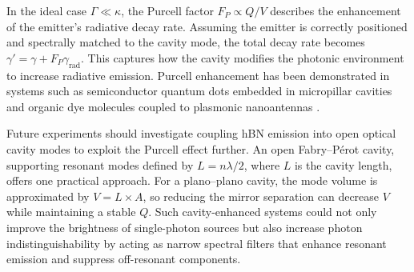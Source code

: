 In the ideal case $\Gamma \ll \kappa$, the Purcell factor $F_P \propto Q/V$ describes the enhancement of the emitter’s radiative decay rate. Assuming the emitter is correctly positioned and spectrally matched to the cavity mode, the total decay rate becomes $\gamma' = \gamma + F_P \gamma_{\text{rad}}$. This captures how the cavity modifies the photonic environment to increase radiative emission. Purcell enhancement has been demonstrated in systems such as semiconductor quantum dots embedded in micropillar cavities \cite{Engel2023} and organic dye molecules coupled to plasmonic nanoantennas \cite{Zhao2020}.

Future experiments should investigate coupling hBN emission into open optical cavity modes to exploit the Purcell effect further. An open Fabry–Pérot cavity, supporting resonant modes defined by $L = n\lambda/2$, where $L$ is the cavity length, offers one practical approach. For a plano–plano cavity, the mode volume is approximated by $V = L \times A$, so reducing the mirror separation can decrease $V$ while maintaining a stable $Q$. Such cavity-enhanced systems could not only improve the brightness of single-photon sources but also increase photon indistinguishability by acting as narrow spectral filters that enhance resonant emission and suppress off-resonant components.


